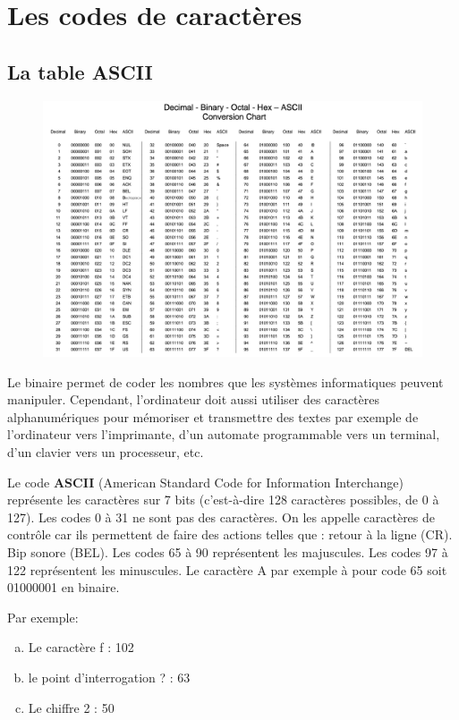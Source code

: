 \documentclass[11pt, a4paper]{book}
\begin{document}
\newpage
\section{Les codes de caractères}

\subsection{La table ASCII}

\begin{center}
\begin{figure}[h!]
\centerline{\includegraphics[width=18cm]{images/ASCII2}}
\end{figure}
\end{center}

Le binaire permet de coder les nombres que les systèmes informatiques peuvent manipuler. Cependant, l'ordinateur doit aussi utiliser des caractères alphanumériques pour mémoriser et transmettre des textes par exemple de l’ordinateur vers l’imprimante, d’un automate programmable vers un terminal, d’un clavier vers un processeur, etc. 

Le code {\bf ASCII} (American Standard Code for Information Interchange) représente les caractères sur 7 bits (c'est-à-dire 128 caractères possibles, de 0 à 127). Les codes 0 à 31 ne sont pas des caractères. On les appelle caractères de contrôle car ils permettent de faire des actions telles que : retour à la ligne (CR). Bip sonore (BEL). Les codes 65 à 90 représentent les majuscules. Les codes 97 à 122 représentent les minuscules. Le caractère A par exemple à pour code 65 soit 01000001 en binaire. 


Par exemple: 
\begin{enumerate}[a)]
\item Le caractère f : 102 
\item le point d'interrogation ? : 63 
\item Le chiffre 2 : 50
\end{enumerate}
\end{document}

